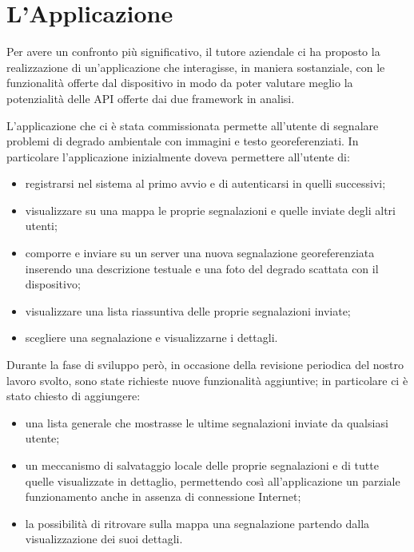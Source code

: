 \chapter{L'Applicazione}
    Per avere un confronto più significativo, il tutore aziendale ci ha proposto
    la realizzazione di un'applicazione che interagisse, in maniera sostanziale,
    con le funzionalità offerte dal dispositivo in modo da poter valutare meglio
    la potenzialità delle API offerte dai due frame\-work in analisi.

    L'applicazione che ci è stata commissionata permette all'utente di segnalare
    problemi di degrado ambientale con immagini e testo georeferenziati.
    In particolare l'applicazione inizialmente doveva permettere all'utente di:
    \begin{itemize}
        \item registrarsi nel sistema al primo avvio e di autenticarsi in quelli
              successivi;
        \item visualizzare su una mappa le proprie segnalazioni e quelle inviate
              degli altri utenti;
        \item comporre e inviare su un server una nuova segnalazione
              georeferenziata inserendo una descrizione testuale e una foto del
              degrado scattata con il dispositivo;
        \item visualizzare una lista riassuntiva delle proprie segnalazioni
              inviate;
        \item scegliere una segnalazione e visualizzarne i dettagli.
    \end{itemize}
    Durante la fase di sviluppo però, in occasione della revisione periodica del
    nostro lavoro svolto, sono state richieste nuove funzionalità aggiuntive; in
    particolare ci è stato chiesto di aggiungere:
    \begin{itemize}
        \item una lista generale che mostrasse le ultime segnalazioni inviate da
              qualsiasi utente;
        \item un meccanismo di salvataggio locale delle proprie segnalazioni e
              di tutte quelle visualizzate in dettaglio, permettendo così
              all'applicazione un parziale funzionamento anche in assenza di
              connessione Internet;
        \item la possibilità di ritrovare sulla mappa una segnalazione partendo
              dalla visualizzazione dei suoi dettagli.
    \end{itemize}

